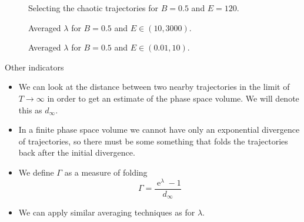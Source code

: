 \documentclass{beamer}
\newcommand{\ee}{\operatorname{e}}          %
\begin{document}

\begin{frame}
	\begin{figure}
		
		\caption{Selecting the chaotic trajectories for \(B=0.5\)
		and \(E=120\).}
	\end{figure}
\end{frame}


\begin{frame}
	\begin{figure}
		
		\caption{Averaged \(\lambda\) for \(B=0.5\) and \(E \in (10, 3000)\).}
	\end{figure}
\end{frame}


\begin{frame}
	\begin{figure}
		
		\caption{Averaged \(\lambda\) for \(B=0.5\) and \(E \in (0.01, 10)\).}
	\end{figure}
\end{frame}


\begin{frame}{Other indicators}
	\begin{itemize}
		\item We can look at the distance between two nearby
		trajectories in the limit of \(T \to \infty\) in order to
		get an estimate of the phase space volume. We will denote this as
		\(d_\infty\).
		\item In a finite phase space volume we cannot have only an
		exponential divergence of trajectories, so there must be some
		something that folds the trajectories back after the initial
		divergence\cite{baranFolding2015}.
		\item We define \(\Gamma\) as a measure of folding
		\[
		\Gamma = \frac{\ee^\lambda - 1}{d_\infty}
		\]
		\item We can apply similar averaging techniques as for \(\lambda\).

	\end{itemize}
\end{frame}
\end{document}
